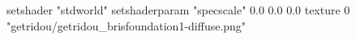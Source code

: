 setshader "stdworld"
setshaderparam "specscale" 0.0 0.0 0.0
texture 0 "getridou/getridou_brisfoundation1-diffuse.png"
